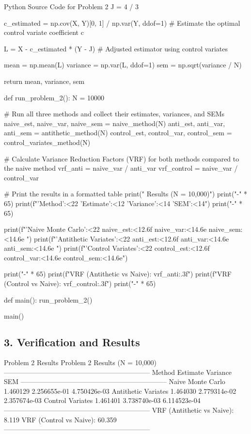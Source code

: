 \documentclass{article}
\begin{document}
\begin{pythonbox}{Python Source Code for Problem 2}
    J = 4 / 3

    c_estimated =  np.cov(X, Y)[0, 1] / np.var(Y, ddof=1) # Estimate the optimal control variate coefficient c

    L = X - c_estimated * (Y - J) # Adjusted estimator using control variates

    mean = np.mean(L)
    variance = np.var(L, ddof=1)
    sem = np.sqrt(variance / N)

    return mean, variance, sem

def run_problem_2():
    N = 10000

    # Run all three methods and collect their estimates, variances, and SEMs
    naive_est, naive_var, naive_sem = naive_method(N)
    anti_est, anti_var, anti_sem = antithetic_method(N)
    control_est, control_var, control_sem = control_variates_method(N)

    # Calculate Variance Reduction Factors (VRF) for both methods compared to the naive method
    vrf_anti = naive_var / anti_var
    vrf_control = naive_var / control_var

    # Print the results in a formatted table
    print(" Results (N = 10,000)")
    print("-" * 65)
    print(f"{'Method':<22} {'Estimate':<12} {'Variance':<14} {'SEM':<14}")
    print("-" * 65)

    print(f"{'Naive Monte Carlo':<22} {naive_est:<12.6f} {naive_var:<14.6e} {naive_sem:<14.6e} ")
    print(f"{'Antithetic Variates':<22} {anti_est:<12.6f} {anti_var:<14.6e} {anti_sem:<14.6e} ")
    print(f"{'Control Variates':<22} {control_est:<12.6f} {control_var:<14.6e} {control_sem:<14.6e}")

    print("-" * 65)
    print(f"VRF (Antithetic vs Naive): {vrf_anti:.3f}")
    print(f"VRF (Control vs Naive):    {vrf_control:.3f}")
    print("-" * 65)

def main():
    run_problem_2()

main()

\end{pythonbox}

\subsection*{3. Verification and Results}
\begin{outputbox}{Problem 2 Results}
Problem 2 Results (N = 10,000)
-----------------------------------------------------------------
Method                 Estimate     Variance       SEM           
-----------------------------------------------------------------
Naive Monte Carlo        1.460129     2.256655e-01   4.750426e-03   
Antithetic Variates    1.464030     2.779314e-02   2.357674e-03   
Control Variates       1.461401     3.738740e-03   6.114523e-04  
-----------------------------------------------------------------
VRF (Antithetic vs Naive): 8.119
VRF (Control vs Naive):    60.359
-----------------------------------------------------------------
\end{outputbox}
\end{document}
